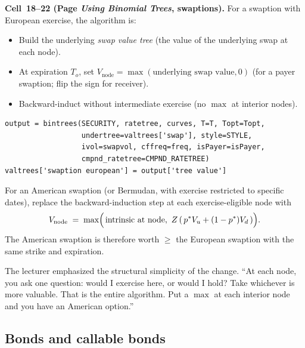 \begin{keyblock}
\textbf{Cell~18--22 (Page \emph{Using Binomial Trees}, swaptions).}
For a swaption with European exercise, the algorithm is:
\begin{itemize}
  \item Build the underlying \emph{swap value tree} (the value of
        the underlying swap at each node).
  \item At expiration $T_o$, set $V_{\text{node}} =
        \max(\text{underlying swap value}, 0)$ (for a payer
        swaption; flip the sign for receiver).
  \item Backward-induct without intermediate exercise (no
        $\max$ at interior nodes).
\end{itemize}

\begin{verbatim}
output = bintrees(SECURITY, ratetree, curves, T=T, Topt=Topt,
                  undertree=valtrees['swap'], style=STYLE,
                  ivol=swapvol, cffreq=freq, isPayer=isPayer,
                  cmpnd_ratetree=CMPND_RATETREE)
valtrees['swaption european'] = output['tree value']
\end{verbatim}

For an American swaption (or Bermudan, with exercise restricted to
specific dates), replace the backward-induction step at each
exercise-eligible node with
\[
  V_{\text{node}}
    \;=\; \max\Bigl(\,
              \text{intrinsic at node},\ Z\,(\,p^* V_u + (1-p^*) V_d\,)
            \Bigr).
\]
The American swaption is therefore worth $\ge$ the European
swaption with the same strike and expiration.
\end{keyblock}

The lecturer emphasized the structural simplicity of the change.
``At each node, you ask one question: would I exercise here, or
would I hold? Take whichever is more valuable. That is the entire
algorithm. Put a $\max$ at each interior node and you have an
American option.''

\subsection{Bonds and callable bonds}\label{L8-sec:callable}

